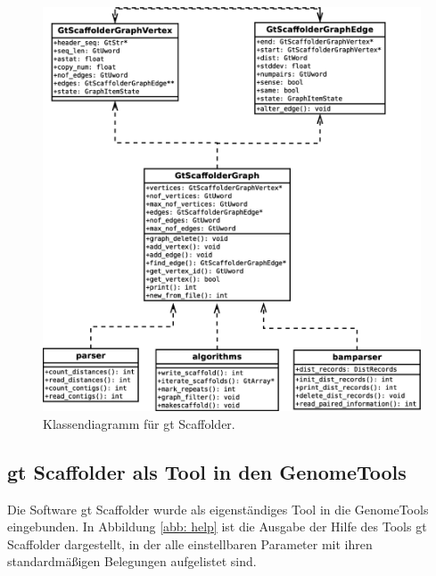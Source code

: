 \documentclass[a4paper,11pt,parskip]{scrartcl}
\begin{document}
\begin{figure}
  \centering
  \includegraphics[width=1\linewidth]{uml.eps}
  \caption{Klassendiagramm für gt Scaffolder.}
\label{abb: UML}
\end{figure}

\subsection{gt Scaffolder als Tool in den GenomeTools}
Die Software gt Scaffolder wurde als eigenständiges Tool in die GenomeTools
eingebunden. In Abbildung \ref{abb: help} ist die Ausgabe der Hilfe des Tools
gt Scaffolder dargestellt, in der alle einstellbaren Parameter mit ihren
standardmäßigen Belegungen aufgelistet sind.
\end{document}
